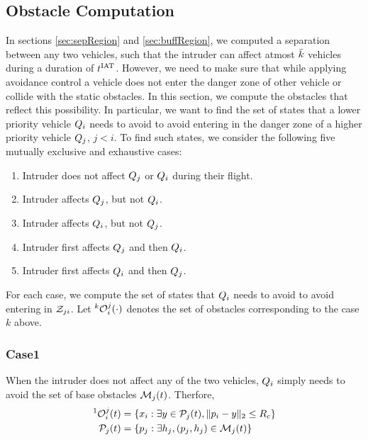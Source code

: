 \subsection{Obstacle Computation} \label{sec:intruderObs}
In sections \ref{sec:sepRegion} and \ref{sec:buffRegion}, we computed a separation between any two vehicles, such that the intruder can affect atmost $\bar{k}$ vehicles during a duration of $t^\text{IAT}$. However, we need to make sure that while applying avoidance control a vehicle does not enter the danger zone of other vehicle or collide with the static obstacles. In this section, we compute the obstacles that reflect this possibility. In particular, we want to find the set of states that a lower priority vehicle $Q_i$ needs to avoid to avoid entering in the danger zone of a higher priority vehicle $Q_j$, $j < i$. To find such states, we consider the following five mutually exclusive and exhaustive cases:
\begin{enumerate}
\item Intruder does not affect $Q_j$ or $Q_i$ during their flight.
\item Intruder affects $Q_j$, but not $Q_i$.
\item Intruder affects $Q_i$, but not $Q_j$.
\item Intruder first affects $Q_j$ and then $Q_i$.
\item Intruder first affects $Q_i$ and then $Q_j$.
\end{enumerate}
For each case, we compute the set of states that $Q_i$ needs to avoid to avoid entering in $\mathcal{Z}_{ji}$. Let $^k\mathcal{O}_i^j(\cdot)$ denotes the set of obstacles corresponding to the case $k$ above. 

\subsubsection{Case1} \label{sec:intruderObs_case1}
When the intruder does not affect any of the two vehicles, $Q_i$ simply needs to avoid the set of base obstacles $\mathcal{M}_j(t)$. Therfore, 
\begin{equation} \label{eq:intruderObs_case1}
\begin{aligned}
^1\ioset_i^j(t) & = \{\state_i: \exists y \in \pfrs_j(t), \|\pos_i - y\|_2 \le \rc \}\\
\pfrs_j(t) & = \{p_j: \exists \npos_j, (p_j, \npos_j) \in \boset_j(t) \}
\end{aligned}
\end{equation}


